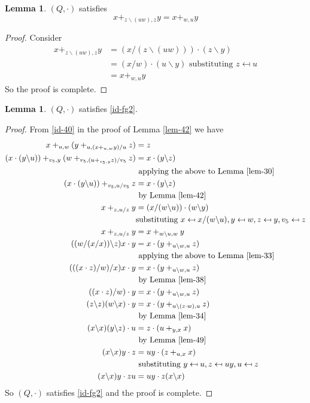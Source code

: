 \documentclass[12pt]{report}
\theoremstyle{definition}
\newtheorem{lem}[thm]{Lemma}
\newcommand{\ldv}{\backslash}       %
\newcommand{\rdv}{/}                %
\begin{document}
\begin{lem}\label{lem-49}
  $(Q, \cdot)$ satisfies
  \[x +_{z\ldv(uw), z} y = x +_{w, u} y\]
\end{lem}

\begin{proof}
  Consider
  \begin{align*}
    x +_{z\ldv(uw), z} y &= (x\rdv (z\ldv (uw)))\cdot (z\ldv y)\\
    &= (x\rdv w)\cdot (u\ldv y)\text{ substituting $z\mapsfrom u$}\\
    &= x +_{w, u} y
  \end{align*}
  So the proof is complete.
\end{proof}

\begin{lem}\label{lem-identities}
  $(Q, \cdot)$ satisfies \ref{id-fg2}.
\end{lem}

\begin{proof}
  From \ref{id-40} in the proof of Lemma \ref{lem-42} we have
  \begin{align*}{2}
    x +_{u, w} (y +_{u, (x +_{u, w} y)\rdv u} z) &= z\\
    (x\cdot (y\ldv u)) +_{v_5, y} (w +_{v_5, (u +_{v_5, y} z)\rdv v_5} z) &= x\cdot (y\ldv z)\\
      &\text{ applying the above to Lemma \ref{lem-30}}\\
    (x\cdot (y\ldv u)) +_{v_5, u\rdv v_5} z &= x\cdot (y\ldv z)\\
      &\text{ by Lemma \ref{lem-42}}\\
    x +_{z, u\rdv z} y &= (x\rdv(w\ldv u))\cdot (w\ldv y)\\
      &\text{substituting $x\mapsfrom x\rdv(w\ldv u), y\mapsfrom w, z\mapsfrom y, v_5\mapsfrom z$}\\
    x +_{z, u\rdv z} y &= x +_{w\ldv u, w} y\\
    ((w\rdv(x\rdv x))\ldv z)x \cdot y &= x\cdot (y +_{u\ldv w, u} z)\\
      &\text{ applying the above to Lemma \ref{lem-33}}\\
    (((x\cdot z)\rdv w)\rdv x)x\cdot y &= x\cdot (y +_{u\ldv w, u} z)\\
      &\text{ by Lemma \ref{lem-38}}\\
    ((x\cdot z)\rdv w)\cdot y &= x\cdot (y +_{u\ldv w, u} z)\\
    (z\ldv z)(w\ldv x)\cdot y &= x\cdot (y +_{u\ldv(z\cdot w), u} z)\\
      &\text{ by Lemma \ref{lem-34}}\\
    (x\ldv x)(y\ldv z)\cdot u &= z\cdot (u +_{y, x} x)\\
      &\text{ by Lemma \ref{lem-49}}\\
    (x\ldv x)y\cdot z &= uy\cdot (z +_{u, x} x)\\
      &\text{ substituting $y\mapsfrom u, z\mapsfrom uy, u\mapsfrom z$}\\
    (x\ldv x)y\cdot zu &= uy\cdot z(x\ldv x) 
  \end{align*}
  So $(Q, \cdot)$ satisfies \ref{id-fg2} and the proof is complete.
\end{proof}
\end{document}
